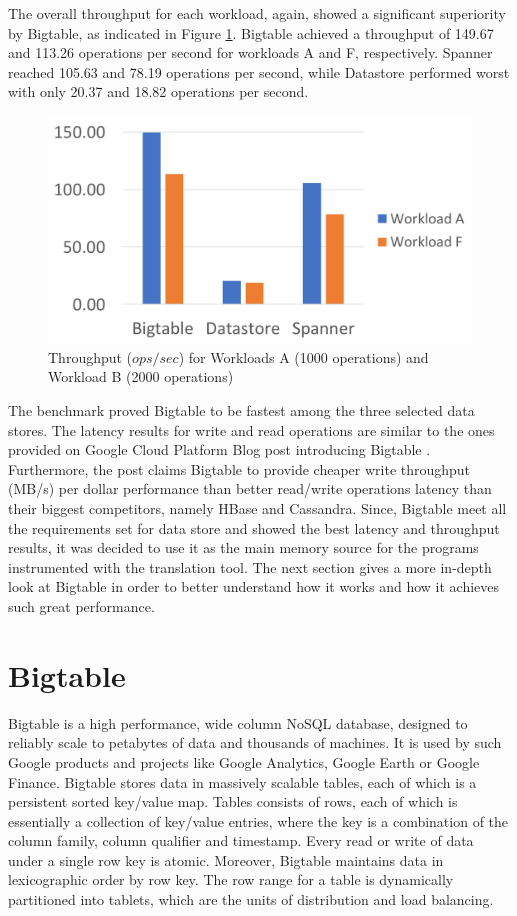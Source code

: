 \documentclass[bsc,frontabs,twoside,singlespacing,parskip,deptreport]{infthesis}     %
\begin{document}
The overall throughput for each workload, again, showed a significant superiority by Bigtable, as indicated in Figure \ref{throughput}. Bigtable achieved a throughput of 149.67 and 113.26 operations per second for workloads A and F, respectively. Spanner reached 105.63 and 78.19 operations per second, while Datastore performed worst with only 20.37 and 18.82 operations per second.

\begin{figure}[H]
	\centering
	\includegraphics[width=12cm]{throughput}
	\caption{Throughput (\(ops/sec\)) for Workloads A (1000 operations) and Workload B (2000 operations)}
	\label{throughput}
\end{figure}

The benchmark proved Bigtable to be fastest among the three selected data stores. The latency results for write and read operations are similar to the ones provided on Google Cloud Platform Blog post introducing Bigtable \citep{bigtable-introduction}. Furthermore, the post claims Bigtable to provide cheaper write throughput (MB/s) per dollar performance than better read/write operations latency than their biggest competitors, namely HBase and Cassandra. Since, Bigtable meet all the requirements set for data store and showed the best latency and throughput results, it was decided to use it as the main memory source for the programs instrumented with the translation tool. The next section gives a more in-depth look at Bigtable in order to better understand how it works and how it achieves such great performance.

\section{Bigtable}

Bigtable \citep{google-bigtable} is a high performance, wide column NoSQL database, designed to reliably scale to petabytes of data and thousands of machines. It is used by such Google products and projects like Google Analytics, Google Earth or Google Finance. Bigtable stores data in massively scalable tables, each of which is a persistent sorted key/value map. Tables consists of rows, each of which is essentially a collection of key/value entries, where the key is a combination of the column family, column qualifier and timestamp. Every read or write of data under a single row key is atomic. Moreover, Bigtable maintains data in lexicographic order by row key. The row range for a table is dynamically partitioned into tablets, which are the units of distribution and load balancing.
\end{document}
